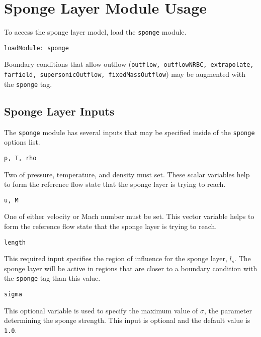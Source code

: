 \documentclass{article}
\begin{document}
\section{Sponge Layer Module Usage}

To access the sponge layer model, load the {\tt sponge} module.

\begin{verbatim}
loadModule: sponge
\end{verbatim}

Boundary conditions that allow outflow ({\tt outflow, outflowNRBC, extrapolate, farfield, supersonicOutflow, fixedMassOutflow}) may be augmented with the {\tt sponge} tag.

\subsection{Sponge Layer Inputs}

The {\tt sponge} module has several inputs that may be specified inside of the {\tt sponge} options list.

  \begin{list}{}{}

  \item {\tt p, T, rho}

    Two of pressure, temperature, and density must set. These scalar variables help to form the reference flow state that the sponge layer is trying to reach.
    
  \item {\tt u, M}
  
    One of either velocity or Mach number must be set. This vector variable helps to form the reference flow state that the sponge layer is trying to reach.
  
  \item {\tt length}
     
    This required input specifies the region of influence for the sponge layer, $l_s$. The sponge layer will be active in regions that are closer to a boundary condition with the {\tt sponge} tag than this value.
    
  \item {\tt sigma}
  
	This optional variable is used to specify the maximum value of {\tt $\sigma$}, the parameter determining the sponge strength. This input is optional and the default value is {\tt 1.0}.

  \end{list}
\end{document}

